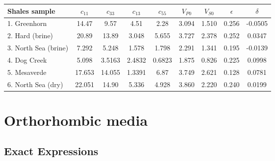{
\centering
     	     \begin{tabular}{|l|c|c|c|c|c|c|c|c|}
     	     \hline Shales sample & $ c_{11}$ & $ c_{33}$ & $ c_{13}$ & $ c_{55} $ & $ V_{P0}$ & $ V_{S0}$ & $ \epsilon $ & $ \delta $\\ 
     	     \hline 1. Greenhorn  & 14.47 & 9.57 & 4.51 & 2.28 & 3.094 & 1.510 & 0.256 & -0.0505\\
     	     \hline 2. Hard (brine) & 20.89 & 13.89 & 3.048 & 5.655 & 3.727 & 2.378 & 0.252 & 0.0347\\
     	     \hline 3. North Sea (brine) & 7.292 & 5.248 & 1.578 & 1.798 & 2.291 & 1.341 & 0.195 & -0.0139\\
     	     \hline 4. Dog Creek & 5.098 & 3.5163 & 2.4832 & 0.6823 & 1.875 & 0.826 & 0.225 & 0.0998\\
     	     \hline 5. Mesaverde & 17.653 & 14.055 & 1.3391 & 6.87 & 3.749 & 2.621 & 0.128 & 0.0781\\
     	     \hline 6. North Sea (dry) & 22.051 & 14.90 & 5.336 & 4.928 & 3.860 & 2.220 & 0.240 & 0.0199\\
      \hline
    \end{tabular}
}


\section{Orthorhombic media}
\subsection{Exact Expressions}

